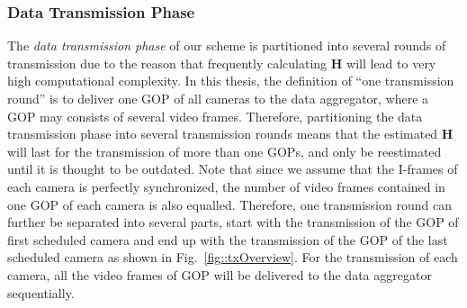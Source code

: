 {\subsubsection{Data Transmission Phase}
\label{sec::dataTransmissionPhase}
The \emph{data transmission phase} of our scheme is partitioned into several rounds of transmission due to the reason that frequently calculating $\mathbf{H}$ will lead to very high computational complexity.
In this thesis, the definition of ``one transmission round'' is to deliver one GOP of all cameras to the data aggregator, where a GOP may consists of several video frames.
Therefore, partitioning the data transmission phase into several transmission rounds means that the estimated $\mathbf{H}$ will last for the transmission of more than one GOPs, and only be reestimated until it is thought to be outdated.
Note that since we assume that the I-frames of each camera is perfectly synchronized, the number of video frames contained in one GOP of each camera is also equalled.
Therefore, one transmission round can further be separated into several parts, start with the transmission of the GOP of first scheduled camera and end up with the transmission of the GOP of the last scheduled camera as shown in Fig.~\ref{fig::txOverview}.
For the transmission of each camera, all the video frames of GOP will be delivered to the data aggregator sequentially.

}
